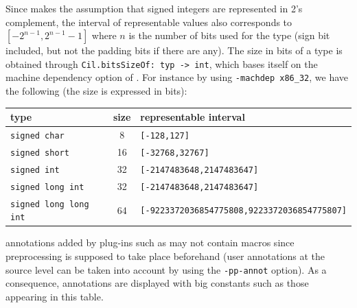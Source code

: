 Since \rte{} makes the assumption that signed integers are represented in 2's
complement, the interval of representable values also corresponds to $[-2^{n-1},
  2^{n-1}-1]$ where $n$ is the number of bits used for the type (sign bit
included, but not the padding bits if there are any).  The size in bits of a
type is obtained through \lstinline|Cil.bitsSizeOf: typ -> int|, which bases
itself on the machine dependency option of \framac{}. For instance by using
\lstinline|-machdep x86_32|, we have the following (the size is expressed in
bits):
\begin{center}
\begin{tabular}{|l|c|l|}
\hline
type & size & representable interval \\
\hline
\lstinline|signed char| & 8 & \lstinline|[-128,127]|  \\
\lstinline|signed short| & 16 & \lstinline|[-32768,32767]| \\
\lstinline|signed int| & 32 & \lstinline|[-2147483648,2147483647]| \\
\lstinline|signed long int| & 32 & \lstinline|[-2147483648,2147483647]| \\
\lstinline|signed long long int| & 64 & \lstinline|[-9223372036854775808,9223372036854775807]| \\
\hline
\end{tabular}
\end{center}

\medskip
\framac{} annotations added by plug-ins such as \rte{} may not contain macros
since preprocessing is supposed to take place beforehand (user annotations at
the source level can be taken into account by using the \lstinline|-pp-annot|
option).  As a consequence, annotations are displayed with big constants such as
those appearing in this table.


